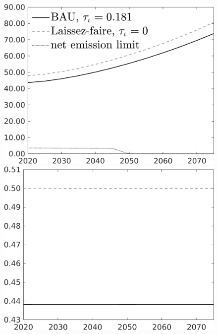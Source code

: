 \documentclass[12pt]{article}
\begin{document}
\begin{figure}[h!!]
\begin{minipage}[]{0.32\textwidth}
	\end{minipage}	
	\begin{minipage}[]{0.32\textwidth}
		\includegraphics[width=1\textwidth]{../../codding_model/own_basedOnFried/optimalPol_010922_revision/figures/all_13Sept22/CompTaul_Equlab_LFBAU_Reg0_Emnet_spillover0_nsk0_xgr0_knspil0_sep1_countec0_GovRev0_etaa0.79_lgd1.png}
	\end{minipage}	
	\begin{minipage}[]{0.32\textwidth}
		\includegraphics[width=1\textwidth]{../../codding_model/own_basedOnFried/optimalPol_010922_revision/figures/all_13Sept22/CompTaul_Equlab_LFBAU_Reg0_hh_spillover0_nsk0_xgr0_knspil0_sep1_countec0_GovRev0_etaa0.79_lgd0.png}

\end{minipage}
\end{figure}
\end{document}
